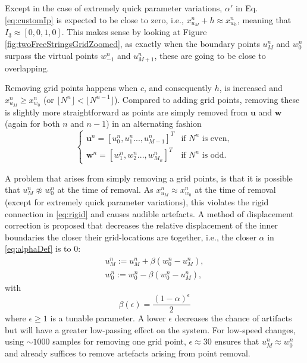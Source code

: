 Except in the case of extremely quick parameter variations, $\alpha'$ in Eq. \eqref{eq:customIp} is expected to be close to zero, i.e., $x_{u_M}^n + h \approx x_{w_0}^n$, meaning that $I_3 \approx [0, 0, 1, 0]$. This makes sense by looking at Figure \ref{fig:twoFreeStringsGridZoomed}, as exactly when the boundary points $u_M^n$ and $w_0^n$ surpass the virtual points $w_{-1}^n$ and $u_{M+1}^n$, these are going to be close to overlapping.

Removing grid points happens when $c$, and consequently $h$, is increased and $x_{u_M}^n \geq x_{w_0}^n$ (or $\lfloor N^n\rfloor < \lfloor N^{n-1}\rfloor$). Compared to adding grid points, removing these is slightly more straightforward as points are simply removed from $\mathbf{u}$ and $\mathbf{w}$ (again for both $n$ and $n-1$) in an alternating fashion
\begin{equation}\label{eq:removingPoint}
\begin{cases}
    \mathbf{u}^n = [u_0^n, u_1^n ..., u_{M-1}^n]^T & \text{if $N^n$ is even}, \\
     \mathbf{w}^n = [w_1^n, w_2^n ..., w_{M_w}^n]^T & \text{if $N^n$ is odd}.
    \end{cases}
\end{equation}

A problem that arises from simply removing a grid points, is that it is possible that $u_M^n \not\approx w_0^n$ at the time of removal. As $x_{u_M}^n \approx x_{w_0}^n$ at the time of removal (except for extremely quick parameter variations), this violates the rigid connection in \eqref{eq:rigid} and causes audible artefacts. A method of displacement correction is proposed that decreases the relative displacement of the inner boundaries the closer their grid-locations are together, i.e., the closer $\alpha$ in \eqref{eq:alphaDef} is to 0:
\begin{equation}\label{eq:dispCorr}
    \begin{aligned}
    u_M^n := u_M^n +\beta (w_0^n - u_M^n),\\
    w_0^n := w_0^n - \beta  (w_0^n - u_M^n),
    \end{aligned}
\end{equation}
with
\begin{equation}\label{eq:betaDef}
    \beta(\epsilon) = \frac{(1-\alpha)^\epsilon}{2}
\end{equation}
where $\epsilon \geq 1$ is a tunable parameter. A lower $\epsilon$ decreases the chance of artifacts but will have a greater low-passing effect on the system. For low-speed changes, using $\sim 1000$ samples for removing one grid point, $\epsilon \approx 30$ ensures that $u_M^n \approx w_0^n$ and already suffices to remove artefacts arising from point removal.


